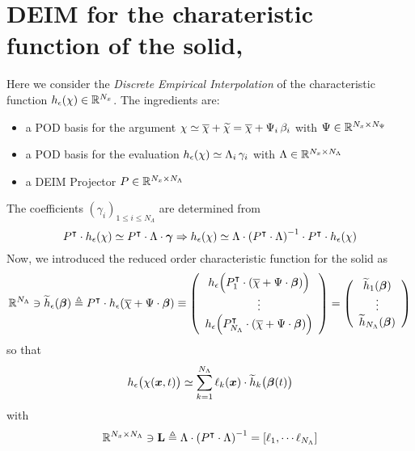 \documentclass[10pt,a4paper]{article}
\begin{document}
\section{DEIM for the charateristic function of the solid,}
%
%
%
Here we consider the \emph{Discrete Empirical Interpolation} \cite{barrault2004empirical, chaturantabut2010nonlinear} of the characteristic function $h_{\epsilon}(\chi)\in \mathbb{R}^{N_x}$. The ingredients are:
\begin{itemize}
\item a POD basis for the argument $\chi \simeq \overline{\chi} + {\widetilde{\chi}} = \overline{\chi} + \Psi_i\,\beta_i$ with $\Psi\in\mathbb{R}^{N_x \times N_\Psi}$
\item a POD basis for the evaluation $h_{\epsilon}(\chi) \simeq \Lambda_i \, \gamma_i$ with $\Lambda\in\mathbb{R}^{N_x \times N_\Lambda}$
\item a DEIM Projector $P\in\mathbb{R}^{N_x \times N_\Lambda}$
\end{itemize}
%
The coefficients $(\gamma_i)_{1\leq i \leq N_\Lambda}$ are determined from
$$P^\intercal \cdot h_{\epsilon}(\chi) \simeq P^\intercal \cdot \Lambda \cdot \boldsymbol{\gamma} \Rightarrow h_{\epsilon}(\chi) \simeq \Lambda \cdot \left(P^\intercal \cdot \Lambda\right)^{-1}\cdot P^\intercal \cdot h_{\epsilon}(\chi) $$
%
Now, we introduced the reduced order characteristic function for the solid  as 
$$ \mathbb{R}^{N_\Lambda} \ni \widetilde{h}_{\epsilon}(\boldsymbol{\beta}) \triangleq P^\intercal \cdot h_{\epsilon}(\overline{\chi} + \Psi\cdot\boldsymbol{\beta}) \equiv 
\left( 
\begin{array}{c}
h_{\epsilon}\Big(P_1^\intercal \cdot (\overline{\chi} + \Psi\cdot\boldsymbol{\beta})\Big) \\
\vdots \\
h_{\epsilon}\Big(P_{N_\Lambda}^\intercal \cdot (\overline{\chi} + \Psi\cdot\boldsymbol{\beta})\Big)
\end{array} 
\right)
=
\left( 
\begin{array}{c}
\widetilde{h}_1(\boldsymbol{\beta}) \\
\vdots \\
\widetilde{h}_{N_\Lambda}(\boldsymbol{\beta}) \\
\end{array} 
\right)
$$
%
so that 
$$h_{\epsilon}\big(\chi(\boldsymbol{x}, t)\big) \simeq \sum_{k=1}^{N_\Lambda} \ell_k(\boldsymbol{x}) \cdot \widetilde{h}_k\big(\boldsymbol{\beta}(t)\big) $$
%
with
$$\mathbb{R}^{N_x \times N_\Lambda}\ni\mathbf{L} \triangleq \Lambda \cdot \left(P^\intercal \cdot \Lambda\right)^{-1}=[\ell_1,\cdots \ell_{N_\Lambda}]$$
%
%
\end{document}
